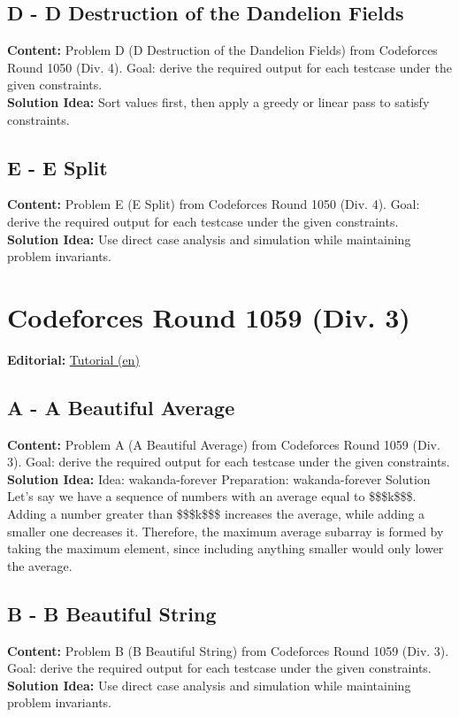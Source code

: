 \documentclass[11pt]{article}
\begin{document}
\subsection{D - D Destruction of the Dandelion Fields}
\textbf{Content:} Problem D (D Destruction of the Dandelion Fields) from Codeforces Round 1050 (Div. 4). Goal: derive the required output for each testcase under the given constraints.\\
\textbf{Solution Idea:} Sort values first, then apply a greedy or linear pass to satisfy constraints.

\subsection{E - E Split}
\textbf{Content:} Problem E (E Split) from Codeforces Round 1050 (Div. 4). Goal: derive the required output for each testcase under the given constraints.\\
\textbf{Solution Idea:} Use direct case analysis and simulation while maintaining problem invariants.

\section{Codeforces Round 1059 (Div. 3)}
\textbf{Editorial:} \href{https://codeforces.com/blog/entry/147242}{Tutorial (en)}

\subsection{A - A Beautiful Average}
\textbf{Content:} Problem A (A Beautiful Average) from Codeforces Round 1059 (Div. 3). Goal: derive the required output for each testcase under the given constraints.\\
\textbf{Solution Idea:} Idea: wakanda-forever Preparation: wakanda-forever Solution Let's say we have a sequence of numbers with an average equal to \$\$\$k\$\$\$. Adding a number greater than \$\$\$k\$\$\$ increases the average, while adding a smaller one decreases it. Therefore, the maximum average subarray is formed by taking the maximum element, since including anything smaller would only lower the average.

\subsection{B - B Beautiful String}
\textbf{Content:} Problem B (B Beautiful String) from Codeforces Round 1059 (Div. 3). Goal: derive the required output for each testcase under the given constraints.\\
\textbf{Solution Idea:} Use direct case analysis and simulation while maintaining problem invariants.
\end{document}
